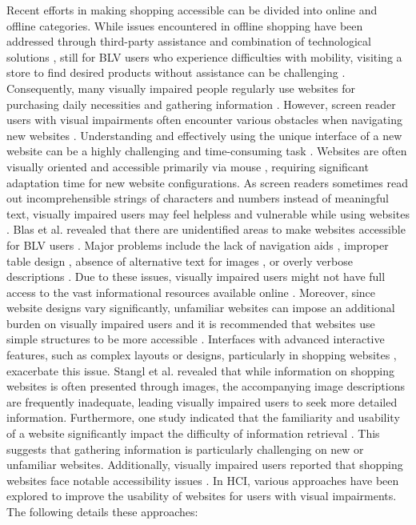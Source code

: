 Recent efforts in making shopping accessible can be divided into online and offline categories. While issues encountered in offline shopping have been addressed through third-party assistance \cite{offlineshopping1} and combination of technological solutions \cite{offlineshopping2,offlineshopping3}, still for BLV users who experience difficulties with mobility, visiting a store to find desired products without assistance can be challenging \cite{10.1145/2971648.2971723, 10.1145/2513383.2513449}. Consequently, many visually impaired people regularly use websites for purchasing daily necessities and gathering information \cite{10.1145/3234695.3236337}. However, screen reader users with visual impairments often encounter various obstacles when navigating new websites \cite{10.1145/2207676.2207736}. Understanding and effectively using the unique interface of a new website can be a highly challenging and time-consuming task \cite{10.1145/1805986.1806005}. Websites are often visually oriented and accessible primarily via mouse \cite{10.1145/1805986.1806005}, requiring significant adaptation time for new website configurations. As screen readers sometimes read out incomprehensible strings of characters and numbers instead of meaningful text, visually impaired users may feel helpless and vulnerable while using websites \cite{baker2005building}. Blas et al. revealed that there are unidentified areas to make websites accessible for BLV users \cite{Blas2004UsableAT}. Major problems include the lack of navigation aids \cite{10.1145/3173574.3173585}, improper table design \cite{10.1145/274497.274521}, absence of alternative text for images \cite{10.1145/3173574.3174092, 10.1145/2470654.2481291, 10.1145/1866029.1866080, 10.1145/2702123.2702437}, or overly verbose descriptions \cite{8651676, 10.1145/3167132.3167349}. Due to these issues, visually impaired users might not have full access to the vast informational resources available online \cite{leuthold2008beyond, 10.5555/1162223}. Moreover, since website designs vary significantly, unfamiliar websites can impose an additional burden on visually impaired users and it is recommended that websites use simple structures to be more accessible  \cite{10.1145/1978942.1979001}. Interfaces with advanced interactive features, such as complex layouts or designs, particularly in shopping websites \cite{haubl2000consumer}, exacerbate this issue. Stangl et al. revealed that while information on shopping websites is often presented through images, the accompanying image descriptions are frequently inadequate, leading visually impaired users to seek more detailed information. Furthermore, one study indicated that the familiarity and usability of a website significantly impact the difficulty of information retrieval  \cite{10.1145/3313831.3376404}. This suggests that gathering information is particularly challenging on new or unfamiliar websites. Additionally, visually impaired users reported that shopping websites face notable accessibility issues \cite{webaim_survey}. In HCI, various approaches have been explored to improve the usability of websites for users with visual impairments. The following details these approaches:


